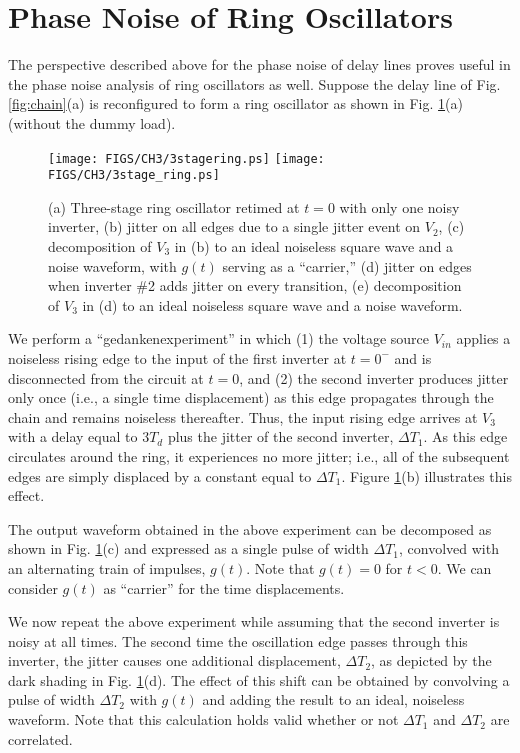  
\section{Phase Noise of Ring Oscillators}

The perspective described above for the phase noise of delay lines proves useful in the phase noise analysis of ring oscillators as well. Suppose the delay line of
Fig. \ref{fig:chain}(a) is reconfigured to form a ring oscillator as shown in Fig. \ref{fig:ring}(a) (without the dummy load).  
\begin{figure}[htb!]
\centering
\texttt{[image: FIGS/CH3/3stagering.ps]}
\texttt{[image: FIGS/CH3/3stage\_ring.ps]}
\caption{(a) Three-stage ring oscillator retimed at $t=0$ with only one noisy inverter, (b) jitter on all edges due to a single jitter event on $V_2$, (c) decomposition of $V_3$ in (b) to an ideal noiseless square
wave and a noise waveform, with $g(t)$ serving as a ``carrier,''
(d) jitter on edges when inverter \#2 adds jitter on every transition, (e) decomposition of $V_3$ in (d) to an ideal noiseless square wave and a noise waveform.}
\label{fig:ring}
\end{figure}
 
We perform a ``gedankenexperiment'' in which (1) the voltage source $V_{in}$ applies a noiseless rising edge to the input of the first inverter at $t=0^-$ and is
disconnected from the circuit at $t=0$, and (2) the second inverter produces jitter only once (i.e., a single time displacement) as this edge propagates through the chain and remains noiseless
thereafter. Thus, the input rising edge arrives at $V_3$ with a delay equal to $3T_d$ plus the jitter of the second inverter, $\Delta T_1$. As this edge circulates
around the ring, it experiences no more jitter; i.e., all of the subsequent edges are simply displaced by a constant equal to $\Delta T_1$. Figure \ref{fig:ring}(b)
illustrates this effect.

The output waveform obtained in the above experiment can be decomposed as shown in Fig. \ref{fig:ring}(c) and expressed as a single pulse of width $\Delta T_1$, convolved with an
alternating train of impulses, $g(t)$. Note that $g(t)=0$ for $t<0$. We can consider $g(t)$ as ``carrier'' for the time displacements.

We now repeat the above experiment while assuming that the second inverter is noisy at all times. The second time the oscillation edge passes through this inverter,
the jitter causes one additional displacement, $\Delta T_2$, as depicted by the dark shading in Fig. \ref{fig:ring}(d). The effect of this shift can be obtained by
convolving a pulse of width $\Delta T_2$ with $g(t)$ and adding the result to an ideal, noiseless waveform. Note that this calculation holds valid whether or not
$\Delta T_1$ and $\Delta T_2$ are correlated.

